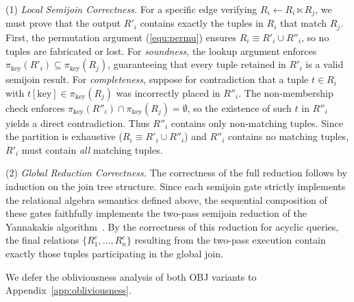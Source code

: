 \documentclass[sigconf]{acmart}
\renewcommand{\emph}[1]{\textit{#1}}
\begin{document}
\noindent (1) \emph{Local Semijoin Correctness.} For a specific edge verifying $R_i \leftarrow R_i \ltimes R_j$, we must prove that the output $R'_i$ contains exactly the tuples in $R_i$ that match $R_j$.
First, the permutation argument (\eqref{equ:permu}) ensures $R_i \equiv R'_i \cup R''_i$, so no tuples are fabricated or lost.
For \emph{soundness}, the lookup argument enforces $\pi_{\text{key}}(R'_i) \subseteq \pi_{\text{key}}(R_j)$, guaranteeing that every tuple retained in $R'_i$ is a valid semijoin result.
For \emph{completeness}, suppose for contradiction that a tuple $t \in R_i$ with $t[\text{key}] \in \pi_{\text{key}}(R_j)$ was incorrectly placed in $R''_i$. The non-membership check enforces $\pi_{\text{key}}(R''_i) \cap \pi_{\text{key}}(R_j) = \emptyset$, so the existence of such $t$ in $R''_i$ yields a direct contradiction. Thus $R''_i$ contains only non-matching tuples.
Since the partition is exhaustive ($R_i \equiv R'_i \cup R''_i$) and $R''_i$ contains no matching tuples, $R'_i$ must contain \emph{all} matching tuples.

\noindent (2) \emph{Global Reduction Correctness.}
The correctness of the full reduction follows by induction on the join tree structure. Since each semijoin gate strictly implements the relational algebra semantics defined above, the sequential composition of these gates faithfully implements the two-pass semijoin reduction of the Yannakakis algorithm~\cite{yannakakis1981algorithms}. By the correctness of this reduction for acyclic queries, the final relations $\{R_1^c, \dots, R_n^c\}$ resulting from the two-pass execution contain exactly those tuples participating in the global join.

We defer the obliviousness analysis of both OBJ variants to Appendix~\ref{app:obliviousness}.
\end{document}
